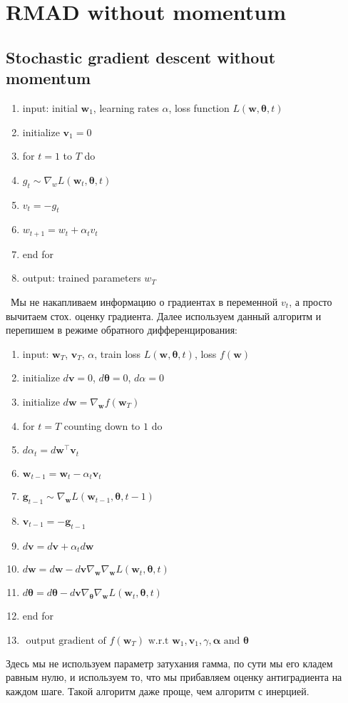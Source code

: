\documentclass[a4paper,14pt]{extarticle}
\numberwithin{equation}{section}
\begin{document}
	\section*{RMAD without momentum}
	\subsection*{Stochastic gradient descent without momentum}
	\begin{enumerate}
		\item input: initial $\mathbf{w}_1$, learning rates $\alpha$, loss function $L(\mathbf{w},\mathbf{\theta},t)$
		\item initialize $\mathbf{v}_1 = 0$
		\item for $t=1$ to $T$ do
		\item $g_t \sim \nabla_w L(\mathbf{w}_t,\mathbf{\theta},t)$
		\item $v_t = - g_t$
		\item $w_{t+1} = w_t + \alpha_t v_t$
		\item end for
		\item output: trained parameters $w_T$
		
	\end{enumerate}
 Мы не накапливаем информацию о градиентах в переменной $v_t$, а просто вычитаем стох. оценку градиента. Далее используем данный алгоритм и перепишем в режиме обратного дифференцирования:
\begin{enumerate}
	\item input: $\mathbf{w}_T$, $\mathbf{v}_T$, $\alpha$, train loss $L(\mathbf{w}, \mathbf{\theta}, t)$, loss $f(\mathbf{w})$
	\item initialize $d\mathbf{v}=0$, $d\mathbf{\theta}=0$, $d\alpha =0$
	\item initialize $d\mathbf{w} = \nabla_\mathbf{w} f (\mathbf{w}_T )$
	\item for $t=T$ counting down to $1$ do
	\item $d \alpha_{t}=d \mathbf{w}^{\top} \mathbf{v}_{t}$
	\item $\mathbf{w}_{t-1}=\mathbf{w}_{t}-\alpha_{t} \mathbf{v}_{t}$
	\item $\mathbf{g}_{t-1} \sim \nabla_{\mathbf{w}} L\left(\mathbf{w}_{t-1}, \boldsymbol{\theta}, t-1\right)$
	\item $\mathbf{v}_{t-1} = - \mathbf{g}_{t-1}$
	\item $d \mathbf{v}=d \mathbf{v}+\alpha_{t} d \mathbf{w}$
	\item $d \mathbf{w}=d \mathbf{w}- d \mathbf{v} \nabla_{\mathbf{w}} \nabla_{\mathbf{w}} L\left(\mathbf{w}_{t}, \boldsymbol{\theta}, t\right)$
	\item $d \boldsymbol{\theta}=d \boldsymbol{\theta}-d \mathbf{v} \nabla_{\boldsymbol{\theta}} \nabla_{\mathbf{w}} L\left(\mathbf{w}_{t}, \boldsymbol{\theta}, t\right)$
	\item end for
	\item $\text { output gradient of } f\left(\mathbf{w}_{T}\right) \text { w.r.t } \mathbf{w}_{1}, \mathbf{v}_{1}, \gamma, \boldsymbol{\alpha} \text { and } \boldsymbol{\theta}$

\end{enumerate}
	Здесь мы не используем параметр затухания гамма, по сути мы его кладем равным нулю, и используем то, что мы прибавляем оценку антиградиента на каждом шаге. Такой алгоритм даже проще, чем алгоритм с инерцией.
	
\end{document}
